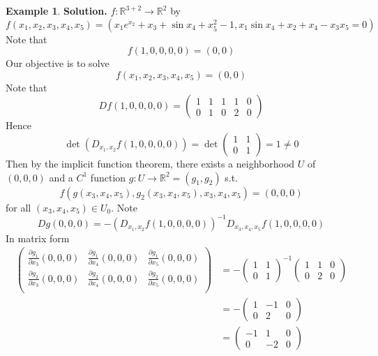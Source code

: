 \documentclass[11pt,a4paper]{article}
\theoremstyle{definition}
\newtheorem{example}[definition]{Example}
\theoremstyle{plain}
\theoremstyle{remark}
\newcommand{\R}{\mathbb{R}}
\begin{document}
\begin{example}
    \textbf{Solution.} $f \colon \R^{3+2} \to \R^2$ by 
    $$f(x_1, x_2, x_3, x_4, x_5) = (x_1 e^{x_2} + x_3 + \sin x_4 + x_5^2 - 1, x_1 \sin x_4 + x_2 + x_4 - x_3 x_5 = 0)$$
    Note that 
    $$f(1,0,0,0,0) = (0,0)$$
    Our objective is to solve 
    $$f(x_1, x_2, x_3, x_4, x_5) = (0,0)$$
    Note that 
    $$Df(1,0,0,0,0) = \begin{pmatrix}
        1 & 1 & 1 & 1 & 0 \\
        0 & 1 & 0 & 2 & 0
    \end{pmatrix}$$
    Hence 
    $$\det (D_{x_1, x_2}f (1,0,0,0,0)) = \det \begin{pmatrix}
        1 & 1 \\ 0 & 1
    \end{pmatrix} = 1 \ne 0$$
    Then by the implicit function theorem, there exists a neighborhood $U$ of $(0,0,0)$ and a $C^1$ function 
    $g \colon U \to \R^2 = (g_1, g_2)$ s.t. 
    $$f(g(x_3, x_4, x_5), g_2(x_3, x_4, x_5), x_3, x_4, x_5) = (0,0,0)$$
    for all $(x_3, x_4, x_5) \in U_0$. Note 
    $$Dg(0,0,0) = - (D_{x_1, x_2}f (1,0,0,0,0))^{-1} D_{x_3,x_4,x_5} f(1,0,0,0,0)$$
    In matrix form 
    \begin{align*}
        \begin{pmatrix}
            \frac{\partial g_1}{\partial x_3}(0,0,0) & \frac{\partial g_1}{\partial x_4}(0,0,0) & \frac{\partial g_1}{\partial x_5}(0,0,0) \\ 
            \frac{\partial g_2}{\partial x_3} (0,0,0)& \frac{\partial g_2}{\partial x_4}(0,0,0) & \frac{\partial g_2}{\partial x_5}(0,0,0) \\ 
        \end{pmatrix} &= - \begin{pmatrix}
            1 & 1 \\ 
            0 & 1
        \end{pmatrix}^{-1} \begin{pmatrix}
            1 & 1 & 0 \\
            0 & 2 & 0
        \end{pmatrix} \\
        &= - \begin{pmatrix}
            1 & -1 & 0 \\
            0 & 2 & 0 
        \end{pmatrix} \\
        &= \begin{pmatrix}
            -1 & 1 & 0 \\
            0 & -2 & 0
        \end{pmatrix}
    \end{align*} 
\end{example}
\end{document}
